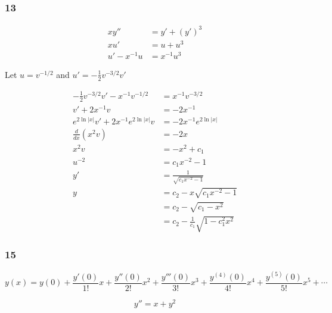 \documentclass{article}
\begin{document}
\subsubsection{13}

\begin{align*}
  x y''         & = y' + (y')^3 \\
  x u'          & = u + u^3     \\
  u' - x^{-1} u & = x^{-1} u^3
\end{align*}

Let $u = v^{-1 / 2}$ and $u' = -\frac{1}{2} v^{-3 / 2} v'$

\begin{align*}
  -\frac{1}{2} v^{-3 / 2} v' - x^{-1} v^{-1 / 2} & = x^{-1} v^{-3 / 2}                        \\
  v' + 2 x^{-1} v                                & = -2 x^{-1}                                \\
  e^{2 \ln |x|} v' + 2 x^{-1} e^{2 \ln |x|} v    & = -2 x^{-1} e^{2 \ln |x|}                  \\
  \frac{d}{dx} (x^2 v)                           & = -2x                                      \\
  x^2 v                                          & = -x^2 + c_1                               \\
  u^{-2}                                         & = c_1 x^{-2} - 1                           \\
  y'                                             & = \frac{1}{\sqrt{c_1 x^{-2} - 1}}          \\
  y                                              & = c_2 - x \sqrt{c_1 x^{-2} - 1}            \\
                                                 & = c_2 - \sqrt{c_1 - x^2}                   \\
                                                 & = c_2 - \frac{1}{c_1} \sqrt{1 - c_1^2 x^2}
\end{align*}

\subsubsection{15}

\[y(x) = y(0) + \frac{y'(0)}{1!} x + \frac{y''(0)}{2!} x^2 + \frac{y'''(0)}{3!} x^3 + \frac{y^{(4)}(0)}{4!} x^4 + \frac{y^{(5)}(0)}{5!} x^5 + \cdots\]

\[y'' = x + y^2\]
\end{document}
